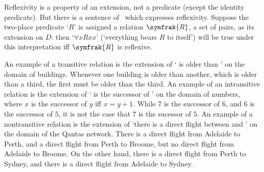 \begin{earg}
Reflexivity is a property of an extension, not a predicate (except the identity predicate). But there is a sentence of \FOL\ which expresses reflexivity. Suppose the two-place predicate `$R$' is assigned a relation $\symfrak{R}$, a set of pairs, as its extension on $D$: then `$\forall x Rxx$' (`everything bears $R$ to itself') will be true under this interpretation iff $\symfrak{R}$ is reflexive. 

An example of a transitive relation is the extension of ` is older than ' on the domain of buildings. Whenever one building is older than another, which is older than a third, the first must be older than the third. An example of an intransitive relation is the extension of ` is the successor of ' on the domain of numbers, where $x$ is the successor of $y$ iff $x = y+1$. While $7$ is the successor of $6$, and $6$ is the successor of $5$, it is not the case that $7$ is the sucessor of $5$. An example of a nontransitive relation is the extension of `there is a direct flight between  and ' on the domain of the Qantas network. There is a direct flight from Adelaide to Perth, and a direct flight from Perth to Broome, but no direct flight from Adelaide to Broome. On the other hand, there is a direct flight from Perth to Sydney, and there is a direct flight from Adelaide to Sydney. 


\end{earg}
